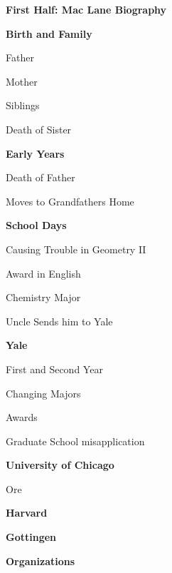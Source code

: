 \documentclass[10pt]{article}
\begin{document}
\begin{outline}
\item \large \textbf{First Half: Mac Lane Biography} 
\normalsize
	\begin{outline}
	    \item \textbf{Birth and Family}
	    \begin{outline}
    		\item Father
		    \item Mother
		    \item Siblings
			\begin{outline}
			    \item Death of Sister
			\end{outline}
		\end{outline}
		\item \textbf{Early Years}
            \begin{outline}			
			    \item Death of Father
			    \item Moves to Grandfathers Home
			\end{outline}
		\item \textbf{School Days}
		    \begin{outline}
			    \item Causing Trouble in Geometry II
			    \item Award in English
			    \item Chemistry Major
			    \item Uncle Sends him to Yale
			\end{outline}
		\item \textbf{Yale}
		    \begin{outline}
			    \item First and Second Year
			    \item Changing Majors			
		        \item Awards
			    \item Graduate School misapplication
            \end{outline}
		\item \textbf{University of Chicago}
            \begin{outline}			
			    \item Ore
            \end{outline}		
		\item \textbf{Harvard}
		\item \textbf{Gottingen}
		\item \textbf{Organizations}
            \begin{outline}			

\end{outline}
\end{outline}
\end{outline}
\end{document}
